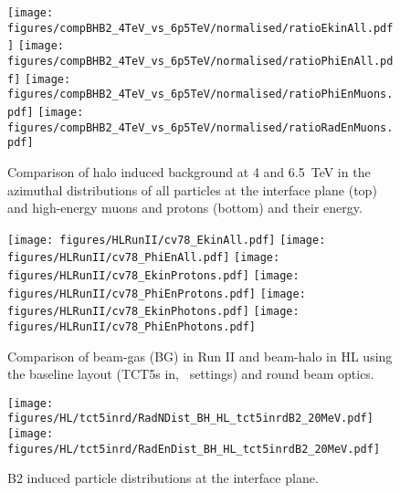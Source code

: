 \begin{figure}%
\begin{center}
  \texttt{[image: figures/compBHB2\_4TeV\_vs\_6p5TeV/normalised/ratioEkinAll.pdf]}
  \texttt{[image: figures/compBHB2\_4TeV\_vs\_6p5TeV/normalised/ratioPhiEnAll.pdf]}
  \texttt{[image: figures/compBHB2\_4TeV\_vs\_6p5TeV/normalised/ratioPhiEnMuons.pdf]}
  \texttt{[image: figures/compBHB2\_4TeV\_vs\_6p5TeV/normalised/ratioRadEnMuons.pdf]}
\end{center}
\vspace{-0.6cm}
 \caption{Comparison of halo induced background at 4 and 6.5~TeV in the azimuthal distributions of all particles at the interface plane (top) and high-energy muons and protons (bottom) and their energy.
  \label{compBHB2run1run2}}
\end{figure}



\begin{figure}
\begin{center}
  \texttt{[image: figures/HLRunII/cv78\_EkinAll.pdf]}
  \texttt{[image: figures/HLRunII/cv78\_PhiEnAll.pdf]}
  \texttt{[image: figures/HLRunII/cv78\_EkinProtons.pdf]}
  \texttt{[image: figures/HLRunII/cv78\_PhiEnProtons.pdf]}
  \texttt{[image: figures/HLRunII/cv78\_EkinPhotons.pdf]}
  \texttt{[image: figures/HLRunII/cv78\_PhiEnPhotons.pdf]}
\end{center}
\vspace{-0.6cm}
 \caption{Comparison of beam-gas (BG) in Run II and beam-halo in HL using the baseline layout (TCT5s in, \twosigmaret~settings) and round beam optics.
  \label{fig:hlrun22}}
\end{figure}


\begin{figure}
\begin{center}

\texttt{[image: figures/HL/tct5inrd/RadNDist\_BH\_HL\_tct5inrdB2\_20MeV.pdf]}
\texttt{[image: figures/HL/tct5inrd/RadEnDist\_BH\_HL\_tct5inrdB2\_20MeV.pdf]}
\end{center}
\vspace{-0.6cm}
 \caption{B2 induced particle distributions at the interface plane.}
  \label{tct5inrdb2retr2}
\end{figure}



